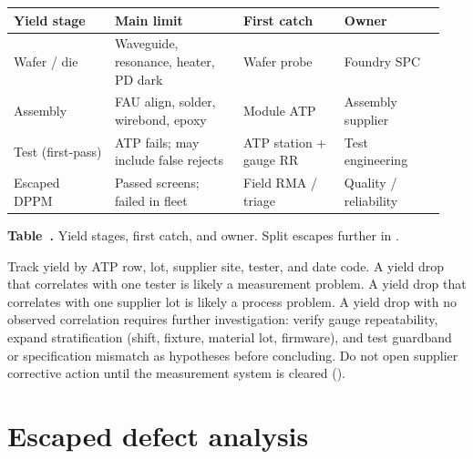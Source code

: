 \begin{table}[ht]
\label{tab:yield-split}%
\centering
\setlength{\tabcolsep}{3.5pt}%
\footnotesize
\renewcommand{\arraystretch}{1.25}%
\begin{tabular}{@{}p{0.22\linewidth}p{0.28\linewidth}p{0.22\linewidth}p{0.22\linewidth}@{}}
\toprule
Yield stage & Main limit & First catch & Owner \\
\midrule
Wafer / die & Waveguide, resonance, heater, PD dark & Wafer probe & Foundry SPC \\
\addlinespace[1.5em]
Assembly & FAU align, solder, wirebond, epoxy & Module ATP & Assembly supplier \\
\addlinespace[1.5em]
Test (first-pass) & ATP fails; may include false rejects & ATP station + gauge RR & Test engineering \\
\addlinespace[1.5em]
Escaped DPPM & Passed screens; failed in fleet & Field RMA / triage & Quality / reliability \\
\bottomrule
\end{tabular}
\par\medskip
{\raggedright\footnotesize\textbf{Table~\thetable.} Yield stages, first catch, and
owner. Split escapes further in .\par}
\end{table}
\FloatBarrier

Track yield by ATP row, lot, supplier site, tester, and date code. A yield drop
that correlates with one tester is likely a measurement problem. A yield drop that
correlates with one supplier lot is likely a process problem. A yield drop with no
observed correlation requires further investigation: verify gauge repeatability,
expand stratification (shift, fixture, material lot, firmware), and test guardband
or specification mismatch as hypotheses before concluding. Do not open supplier
corrective action until the measurement system is cleared ().



\section{Escaped defect analysis}
\label{sec:escaped-defects}

